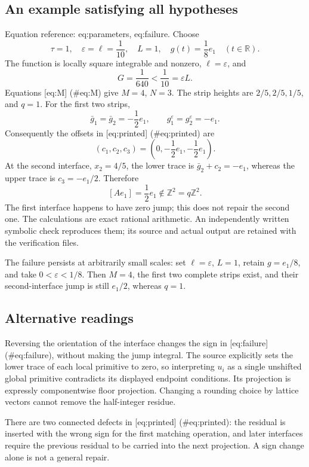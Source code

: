 \documentclass[10pt]{article}
\begin{document}
\subsection*{An example satisfying all hypotheses}
Equation reference: eq:parameters, eq:failure. Choose \[
 \tau=1,\quad \varepsilon=\ell=\frac1{10},\quad L=1,\quad
 g(t)=\frac18e_1\quad (t\in\mathbb R).\] The function is locally square integrable and nonzero, \(\ell=\varepsilon\), and \[G=\frac1{640}<\frac1{10}=\varepsilon L.\] Equations [eq:M] (\#eq:M) give \(M=4\), \(N=3\). The strip heights are \(2/5,2/5,1/5\), and \(q=1\). For the first two strips, \[\bar g_1=\bar g_2=-\frac12e_1,\qquad
 g_1^\varepsilon=g_2^\varepsilon=-e_1.\] Consequently the offsets in [eq:printed] (\#eq:printed) are \[(c_1,c_2,c_3)=\left(0,-\frac12e_1,-\frac12e_1\right).\] At the second interface, \(x_2=4/5\), the lower trace is \(\bar g_2+c_2=-e_1\), whereas the upper trace is \(c_3=-e_1/2\). Therefore \[
 [Ae_1]=\frac12e_1\notin\mathbb Z^2=q\mathbb Z^2.\] The first interface happens to have zero jump; this does not repair the second one. The calculations are exact rational arithmetic. An independently written symbolic check reproduces them; its source and actual output are retained with the verification files.\par
The failure persists at arbitrarily small scales: set \(\ell=\varepsilon\), \(L=1\), retain \(g=e_1/8\), and take \(0<\varepsilon<1/8\). Then \(M=4\), the first two complete strips exist, and their second-interface jump is still \(e_1/2\), whereas \(q=1\).\par
\subsection*{Alternative readings}
Reversing the orientation of the interface changes the sign in [eq:failure] (\#eq:failure), without making the jump integral. The source explicitly sets the lower trace of each local primitive to zero, so interpreting \(u_i\) as a single unshifted global primitive contradicts its displayed endpoint conditions. Its projection is expressly componentwise floor projection. Changing a rounding choice by lattice vectors cannot remove the half-integer residue.\par
There are two connected defects in [eq:printed] (\#eq:printed): the residual is inserted with the wrong sign for the first matching operation, and later interfaces require the previous residual to be carried into the next projection. A sign change alone is not a general repair.\par
\end{document}
